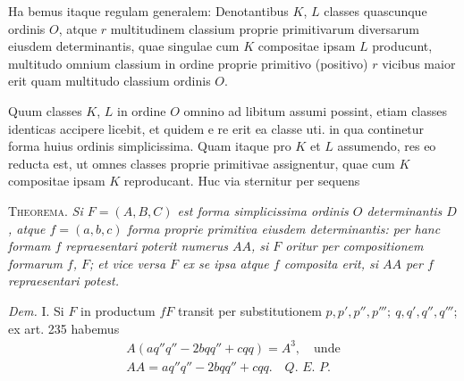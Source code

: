 Ha%
bemus itaque regulam generalem: Denotantibus \(K\), \(L\) classes quascunque ordinis \(O\), atque \(r\) multitudinem classium proprie primitivarum diversarum eiusdem determinantis, quae singulae cum \(K\) compositae ipsam \(L\) producunt, multitudo omnium classium in ordine proprie primitivo (positivo) \(r\) vicibus maior erit quam multitudo classium ordinis \(O\).

Quum classes \(K\), \(L\) in ordine \(O\) omnino ad libitum assumi possint, etiam classes identicas accipere licebit, et quidem e re erit ea classe uti. in qua continetur forma huius ordinis simplicissima. Quam itaque pro \(K\) et \(L\) assumendo, res eo reducta est, ut omnes classes proprie primitivae assignentur, quae cum \(K\) compositae ipsam \(K\) reproducant. Huc via sternitur per sequens

\textsc{Theorema.} \textit{Si \(F=(A,B,C)\) est forma simplicissima ordinis \(O\) determinantis \(D\), atque \(f=(a,b,c)\) forma proprie primitiva eiusdem determinantis: per hanc formam \(f\) repraesentari poterit numerus \(AA\), si \(F\) oritur per compositionem formarum \(f\), \(F\); et vice versa \(F\) ex se ipsa atque \(f\) composita erit, si \(AA\) per \(f\) repraesentari potest.}

\textit{Dem.} I. Si \(F\) in productum \(fF\) transit per substitutionem \(p,\allowbreak p',\allowbreak p'',\allowbreak p''';\allowbreak \ q,\allowbreak q',\allowbreak q'',\allowbreak q'''\); ex art. 235 habemus
\[
\begin{gathered}A(aq''q''-2bqq''+cqq)=A^3,\quad\text{unde}\\ AA=aq''q''-2bqq''+cqq.\quad\textit{Q. E. P.}\end{gathered}
\]

